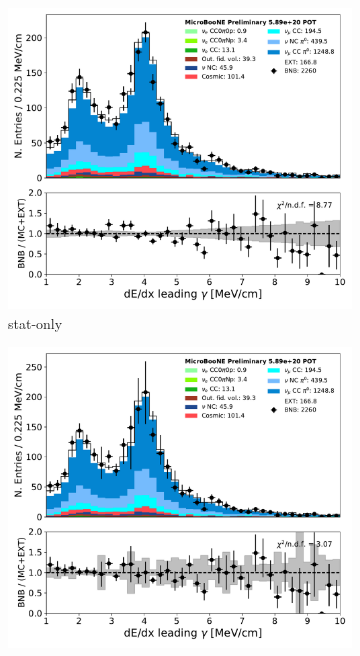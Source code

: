 \documentclass[a4paper]{article}
\begin{document}
\begin{figure}[H] 
\begin{center}
    \begin{subfigure}[b]{0.3\textwidth}
    \centering
    \includegraphics[width=1.00\textwidth]{detsys/datamc/pi0_dedx1_fit_Y_03292020_statonly.pdf}
    \caption{\label{fig:detsys:datamc:dedx:stat} stat-only}
    \end{subfigure}
    \begin{subfigure}[b]{0.3\textwidth}
    \centering
    \includegraphics[width=1.00\textwidth]{detsys/datamc/pi0_dedx1_fit_Y_03292020_detsys_wiremodx.pdf}

\end{subfigure}
\end{center}
\end{figure}
\end{document}
